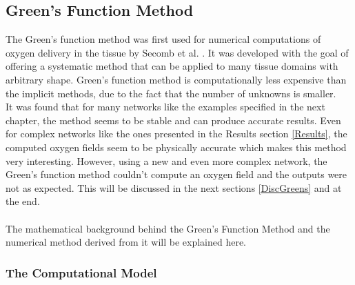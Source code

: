\subsection{Green's Function Method}

The Green's function method was first used for numerical computations of oxygen delivery in the tissue by Secomb et al. \cite{Secomb2004}. It was developed with the goal of offering a systematic method that can be applied to many tissue domains with arbitrary shape. Green's function method is computationally less expensive than the implicit methods, due to the fact that the number of unknowns is smaller.
\\It was found that for many networks like the examples specified in the next chapter, the method seems to be stable and can produce accurate results. Even for complex networks like the ones presented in the Results section  \ref{Results}, the computed oxygen fields seem to be physically accurate which makes this method very interesting. However, using a new and even more complex network, the Green's function method couldn't compute an oxygen field and the outputs were not as expected. This will be discussed in the next sections \ref{DiscGreens} and at the end.\\
\\The mathematical background behind the Green's Function Method and the numerical method derived from it will be explained here.

\subsubsection{The Computational Model}
\label{CompMod}


